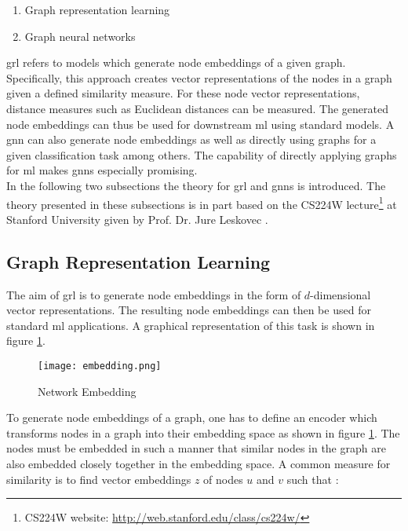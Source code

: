	\begin{enumerate}
		\item Graph representation learning
		\item Graph neural networks
	\end{enumerate}
	
	\noindent \Acl{grl} refers to models which generate node
	embeddings of a given graph. Specifically, this approach creates vector 
	representations of the nodes in a graph given a defined similarity measure. 
	For these node vector representations, distance measures such as Euclidean 
	distances can be measured. The generated node embeddings can thus be used for
	downstream \acs{ml} using standard models. A \acl{gnn} can also generate 
	node embeddings as well as directly using graphs for a given classification 
	task among others. The capability of directly applying graphs for \acs{ml} 
	makes \acsp{gnn} especially promising. \\

	\noindent In the following two subsections the theory for \acs{grl} and
	\acsp{gnn} is introduced. The theory presented in these subsections is in 
	part based on the CS224W lecture\footnote{CS224W website:
	\url{http://web.stanford.edu/class/cs224w/}} at Stanford University given 
	by Prof. Dr. Jure Leskovec \citeyearpar{leskovec2021lecture}. 

	\subsection{Graph Representation Learning}

	The aim of \acf{grl} is to generate node embeddings in 
	the form of $d$-dimensional vector representations. The resulting node 
	embeddings can then be used for standard \acs{ml} applications. A graphical 
	representation of this task is shown in figure 
	\ref{fig:embedding}.

	\begin{figure}[h]
		\centering
		\texttt{[image: embedding.png]}
		\caption{Network Embedding}
		\citep{leskovec2021lecture}
		\label{fig:embedding}
	\end{figure}

	\noindent To generate node embeddings of a graph, one has to define an
	encoder which transforms nodes in a graph into their embedding space as
	shown in figure \ref{fig:embedding}. The nodes must be embedded in such a
	manner that similar nodes in the graph are also embedded closely together 
	in the embedding space. A common measure for similarity is to find vector 
	embeddings $z$ of nodes $u$ and $v$ such that \citep{leskovec2021lecture}:

